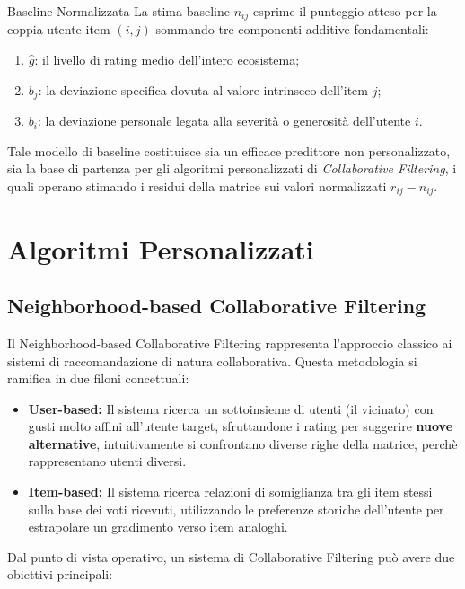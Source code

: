 \begin{definition}{Baseline Normalizzata}
La stima baseline $n_{ij}$ esprime il punteggio atteso per la coppia utente-item $(i, j)$ sommando tre componenti additive fondamentali:
\begin{enumerate}
    \item $\hat{g}$: il livello di rating medio dell'intero ecosistema;
    \item $b_j$: la deviazione specifica dovuta al valore intrinseco dell'item $j$;
    \item $b_i$: la deviazione personale legata alla severità o generosità dell'utente $i$.
\end{enumerate}
\end{definition}

Tale modello di baseline costituisce sia un efficace predittore non personalizzato, sia la base di partenza per gli algoritmi personalizzati di \textit{Collaborative Filtering}, i quali operano stimando i residui della matrice sui valori normalizzati $r_{ij} - n_{ij}$.








\section{Algoritmi Personalizzati}

\subsection{Neighborhood-based Collaborative Filtering}
Il Neighborhood-based Collaborative Filtering rappresenta l'approccio classico ai sistemi di raccomandazione di natura collaborativa. Questa metodologia si ramifica in due filoni concettuali:
\begin{itemize}
\item \textbf{User-based:} Il sistema ricerca un sottoinsieme di utenti (il vicinato) con gusti molto affini all'utente target, sfruttandone i rating per suggerire \textbf{nuove alternative}, intuitivamente si confrontano diverse righe della matrice, perchè rappresentano utenti diversi.
\item \textbf{Item-based:} Il sistema ricerca relazioni di somiglianza tra gli item stessi sulla base dei voti ricevuti, utilizzando le preferenze storiche dell'utente per estrapolare un gradimento verso item analoghi.
\end{itemize}
Dal punto di vista operativo, un sistema di Collaborative Filtering può avere due obiettivi principali:

